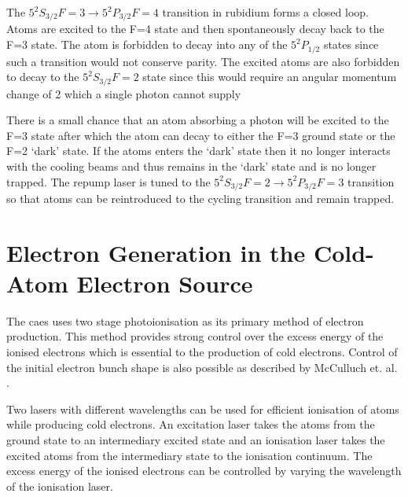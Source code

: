 The $5 ^2 S_{3/2} F=3\rightarrow5 ^2 P_{3/2} F=4$ transition in rubidium forms a closed loop. Atoms are excited to the F=4 state and then spontaneously decay back to the F=3 state. The atom is forbidden to decay into any of the $5 ^2 P_{1/2}$ states since such a transition would not conserve parity. The excited atoms are also forbidden to decay to the $5 ^2 S_{3/2} F=2$ state since this would require an angular momentum change of 2 which a single photon cannot supply

There is a small chance that an atom absorbing a photon will be excited to the F=3 state after which the atom can decay to either the F=3 ground state or the F=2 `dark' state. If the atoms enters the `dark' state then it no longer interacts with the cooling beams and thus remains in the `dark' state and is no longer trapped. The repump laser is tuned to the $5 ^2 S_{3/2} F=2\rightarrow5 ^2 P_{3/2} F=3$ transition so that atoms can be reintroduced to the cycling transition and remain trapped.

\section{Electron Generation in the Cold-Atom Electron Source}
The \gls{caes} uses two stage photoionisation as its primary method of electron production. This method provides strong control over the excess energy of the ionised electrons which is essential to the production of cold electrons. Control of the initial electron bunch shape is also possible as described by McCulluch et. al. \cite{mcculloch_arbitrarily_2011}.

Two lasers with different wavelengths can be used for efficient ionisation of atoms while producing cold electrons. An excitation laser takes the atoms from the ground state to an intermediary excited state and an ionisation laser takes the excited atoms from the intermediary state to the ionisation continuum. The excess energy of the ionised electrons can be controlled by varying the wavelength of the ionisation laser.

